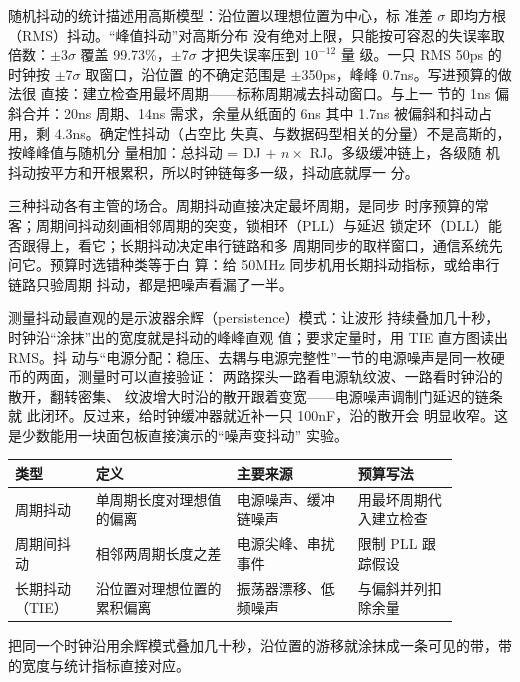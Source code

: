 随机抖动的统计描述用高斯模型：沿位置以理想位置为中心，标
准差 $\sigma$ 即均方根（RMS）抖动。“峰值抖动”对高斯分布
没有绝对上限，只能按可容忍的失误率取倍数：$\pm$3$\sigma$
覆盖 99.73\%，$\pm$7$\sigma$ 才把失误率压到 $10^{-12}$ 量
级。一只 RMS 50ps 的时钟按 $\pm$7$\sigma$ 取窗口，沿位置
的不确定范围是 $\pm$350ps，峰峰 0.7ns。写进预算的做法很
直接：建立检查用最坏周期——标称周期减去抖动窗口。与上一
节的 1ns 偏斜合并：20ns 周期、14ns 需求，余量从纸面的 6ns
其中 1.7ns 被偏斜和抖动占用，剩 4.3ns。确定性抖动（占空比
失真、与数据码型相关的分量）不是高斯的，按峰峰值与随机分
量相加：总抖动 = DJ + $n \times$ RJ。多级缓冲链上，各级随
机抖动按平方和开根累积，所以时钟链每多一级，抖动底就厚一
分。

三种抖动各有主管的场合。周期抖动直接决定最坏周期，是同步
时序预算的常客；周期间抖动刻画相邻周期的突变，锁相环（PLL）与延迟
锁定环（DLL）能否跟得上，看它；长期抖动决定串行链路和多
周期同步的取样窗口，通信系统先问它。预算时选错种类等于白
算：给 50MHz 同步机用长期抖动指标，或给串行链路只验周期
抖动，都是把噪声看漏了一半。

测量抖动最直观的是示波器余辉（persistence）模式：让波形
持续叠加几十秒，时钟沿“涂抹”出的宽度就是抖动的峰峰直观
值；要求定量时，用 TIE 直方图读出 RMS。抖
动与“电源分配：稳压、去耦与电源完整性”一节的电源噪声是同一枚硬币的两面，测量时可以直接验证：
两路探头一路看电源轨纹波、一路看时钟沿的散开，翻转密集、
纹波增大时沿的散开跟着变宽——电源噪声调制门延迟的链条就
此闭环。反过来，给时钟缓冲器就近补一只 100nF，沿的散开会
明显收窄。这是少数能用一块面包板直接演示的“噪声变抖动”
实验。

\begin{longtable}{L{0.16\linewidth}L{0.28\linewidth}L{0.24\linewidth}L{0.2\linewidth}}
\toprule
类型 & 定义 & 主要来源 & 预算写法 \\
\midrule
周期抖动 & 单周期长度对理想值的偏离 & 电源噪声、缓冲链噪声 & 用最坏周期代入建立检查 \\\tablerowrule
周期间抖动 & 相邻两周期长度之差 & 电源尖峰、串扰事件 & 限制 PLL 跟踪假设 \\\tablerowrule
长期抖动（TIE） & 沿位置对理想位置的累积偏离 & 振荡器漂移、低频噪声 & 与偏斜并列扣除余量 \\
\bottomrule
\end{longtable}

把同一个时钟沿用余辉模式叠加几十秒，沿位置的游移就涂抹成一条可见的带，带的宽度与统计指标直接对应。

